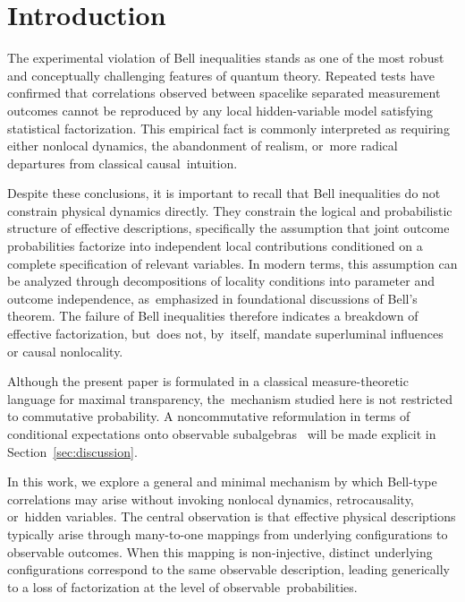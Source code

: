 \documentclass[11pt,a4paper]{article}
\theoremstyle{remark}
\begin{document}
  \section{Introduction}
    \label{sec:introduction}

    The experimental violation of Bell inequalities stands as one of the most robust
    and conceptually challenging features of quantum theory.
    Repeated tests have confirmed that correlations observed between spacelike separated
    measurement outcomes cannot be reproduced by any local hidden-variable model
    satisfying statistical factorization.
    This empirical fact is commonly interpreted as requiring either nonlocal dynamics,
    the abandonment of realism, or~more radical departures from classical causal~intuition.

    Despite these conclusions, it is important to recall that Bell inequalities do not
    constrain physical dynamics directly.
    They constrain the logical and probabilistic structure of effective descriptions,
    specifically the assumption that joint outcome probabilities factorize into independent
    local contributions conditioned on a complete specification of relevant variables.
    In modern terms, this assumption can be analyzed through decompositions of locality
    conditions into parameter and outcome independence, as~emphasized in foundational
    discussions of Bell’s theorem.
    The failure of Bell inequalities therefore indicates a breakdown of effective
    factorization, but~does not, by~itself, mandate superluminal influences or causal
    nonlocality.

    Although the present paper is formulated in a classical measure-theoretic language
    for maximal transparency, the~mechanism studied here is not restricted to commutative
    probability.
    A noncommutative reformulation in terms of conditional expectations onto observable
    subalgebras~\cite{AccardiCecchini1982} will be made explicit in Section~\ref{sec:discussion}.

    In this work, we explore a general and minimal mechanism by which Bell-type
    correlations may arise without invoking nonlocal dynamics, retrocausality, or~hidden
    variables.
    The central observation is that effective physical descriptions typically arise through
    many-to-one mappings from underlying configurations to observable outcomes.
    When this mapping is non-injective, distinct underlying configurations correspond
    to the same observable description, leading generically to a loss of factorization at
    the level of observable~probabilities.
\end{document}
